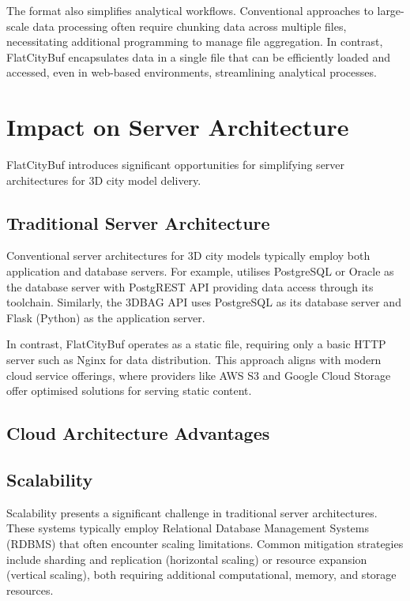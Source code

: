 The format also simplifies analytical workflows. Conventional approaches to large-scale data processing often require chunking data across multiple files, necessitating additional programming to manage file aggregation. In contrast, FlatCityBuf encapsulates data in a single file that can be efficiently loaded and accessed, even in web-based environments, streamlining analytical processes.

\section{Impact on Server Architecture}
\label{affect_on_server_architecture}

FlatCityBuf introduces significant opportunities for simplifying server architectures for 3D city model delivery.

\subsection{Traditional Server Architecture}
\label{traditional_server_architecture}

Conventional server architectures for 3D city models typically employ both application and database servers. For example, \citet{3dcitydb} utilises PostgreSQL or Oracle as the database server with PostgREST API providing data access through its toolchain. Similarly, the 3DBAG API uses PostgreSQL as its database server and Flask (Python) as the application server.

In contrast, FlatCityBuf operates as a static file, requiring only a basic HTTP server such as Nginx for data distribution. This approach aligns with modern cloud service offerings, where providers like AWS S3 and Google Cloud Storage offer optimised solutions for serving static content.

\subsection{Cloud Architecture Advantages}
\label{cloud_architecture_achieved}

\subsection{Scalability}
\label{scalability}

Scalability presents a significant challenge in traditional server architectures. These systems typically employ Relational Database Management Systems (RDBMS) that often encounter scaling limitations. Common mitigation strategies include sharding and replication (horizontal scaling) or resource expansion (vertical scaling), both requiring additional computational, memory, and storage resources.

